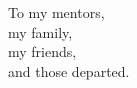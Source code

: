 \label{chap:dedication}

\begin{center}
  \null
  \vspace{2.7in}
  \bigskip
  

  To my mentors, \\
  my family, \\
  my friends, \\
  and those departed.\\


  \newpage
\end{center}
